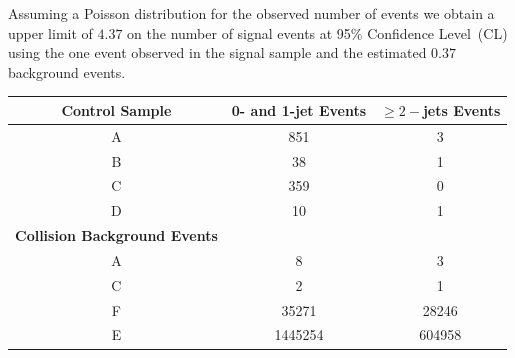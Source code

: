 \par 
Assuming a Poisson distribution for the observed number of events we obtain a upper limit of $4.37$ on the number of signal events at 95\% Confidence Level~(CL) using the one event observed in the signal sample and the estimated $0.37$ background events.

\vspace{5mm}
\begin{minipage}{0.90\linewidth} 
\begin{center}
\begin{tabular}{c|c|c}
\toprule
 \hline
\bfseries{Control Sample} & 0- and 1-jet Events & $\geq 2-$jets Events \\
\hline
\toprule
\textsf{A} & 851 & 3 \\
\textsf{B} & 38 & 1  \\
\textsc{C} & 359 & 0\\
\textsf{D} & 10 & 1 \\
\hline\hline
\bfseries{Collision Background Events} &  \\ \hline \hline
\textsf{A}& 8 &  3\\ 
\textsf{C}& 2 & 1 \\  
\textsf{F} & 35271& 28246 \\    
\textsf{E}&  1445254 & 604958\\             
\hline
\bottomrule
\end{tabular}
\label{tab:EVTYIELD} 
\end{center}
\end{minipage}


